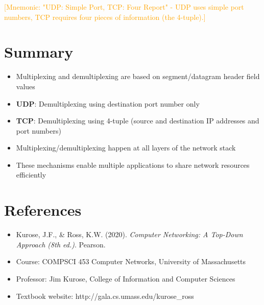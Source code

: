 \documentclass[12pt]{article}
\begin{document}
\textcolor{orange}{[Mnemonic: "UDP: Simple Port, TCP: Four Report" - UDP uses simple port numbers, TCP requires four pieces of information (the 4-tuple).]}

\section{Summary}

\begin{itemize}
    \item Multiplexing and demultiplexing are based on segment/datagram header field values
    \item \textbf{UDP}: Demultiplexing using destination port number only
    \item \textbf{TCP}: Demultiplexing using 4-tuple (source and destination IP addresses and port numbers)
    \item Multiplexing/demultiplexing happen at all layers of the network stack
    \item These mechanisms enable multiple applications to share network resources efficiently
\end{itemize}

\section{References}
\begin{itemize}
    \item Kurose, J.F., \& Ross, K.W. (2020). \textit{Computer Networking: A Top-Down Approach (8th ed.)}. Pearson.
    \item Course: COMPSCI 453 Computer Networks, University of Massachusetts
    \item Professor: Jim Kurose, College of Information and Computer Sciences
    \item Textbook website: http://gala.cs.umass.edu/kurose\_ross
\end{itemize}
\end{document}
